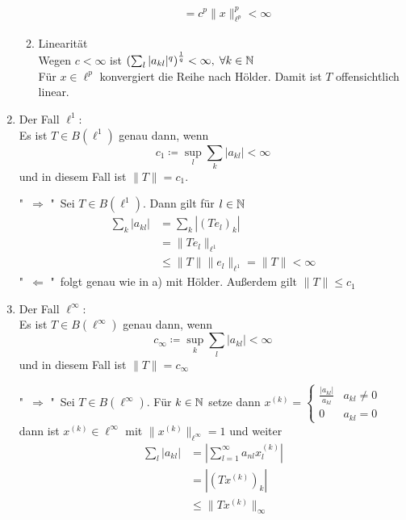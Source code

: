 \begin{beispiel}[Matrizenmultiplikation]
\begin{enumerate}[label=\alph*\upshape)]
\begin{beweis}
\begin{enumerate}
\begin{align*}
										 &= c^{p} \|x\|_{\ell^{p}}^{p} < \infty
					\end{align*}
				\item Linearität \\
					Wegen $c < \infty$ ist $\left( \sum_{l} |a_{kl}|^{q} \right)^{\frac{1}{q}} < \infty, \hspace{0.1cm} \forall k \in \mathbb{N}$ \\
					Für $x \in \ell^{p}$ konvergiert die Reihe nach Hölder. Damit ist $T$ offensichtlich linear.
			\end{enumerate}
		\end{beweis}
	\item Der Fall $\ell^{1}$: \\
		Es ist $T \in B(\ell^{1})$ genau dann, wenn 
		\[ c_{1} \coloneqq \sup_{l} \sum_{k} | a_{kl} | < \infty \]
		und in diesem Fall ist $\| T \| = c_{1}$.
		\begin{beweis}
			"\ $\Rightarrow$ "\  Sei $T \in B(\ell^{1})$. Dann gilt für $l \in \mathbb{N}$
			\begin{align*}
				\sum_{k} | a_{kl} | &= \sum_{k} |(Te_{l})_{k}| \\
								  	&= \| T e_{l} \|_{\ell^{1}}  \\
								  	& \leq \| T \| \| e_{l} \|_{\ell^1} = \| T \| < \infty 
			\end{align*}
			"\ $\Leftarrow$ "\  folgt genau wie in a) mit Hölder. Au{\ss}erdem gilt $\| T \| \leq c_{1}$			
		\end{beweis}
	\item Der Fall $\ell^{\infty}$: \\
		Es ist $T \in B(\ell^{\infty})$ genau dann, wenn
		\[ c_{\infty} \coloneqq \sup_{k} \sum_{l} |a_{kl}| < \infty \]
		und in diesem Fall ist $\| T \| = c_{\infty}$
		\begin{beweis}
			"\ $\Rightarrow$ "\  Sei $T \in B(\ell^{\infty})$.  Für $k \in \mathbb{N}$ setze dann $x^{(k)} = \begin{cases} \frac{|a_{kl}|}{a_{kl}} & a_{kl} \neq 0 \\ 0 & a_{kl} = 0 \end{cases}$ \\
			dann ist $x^{(k)} \in \ell^{\infty}$ mit $\| x^{(k)} \|_{\ell^{\infty}} = 1$ und weiter
			\begin{align*}
				\sum_{l} |a_{kl}| & = | \sum_{l = 1}^{\infty} a_{nl} x_{l}^{(k)} | \\
								  & = | ( T x^{(k)} )_{k} | \\
								  & \leq \| T x^{(k)} \|_{\infty} \\

\end{align*}
\end{beweis}
\end{enumerate}
\end{beispiel}
